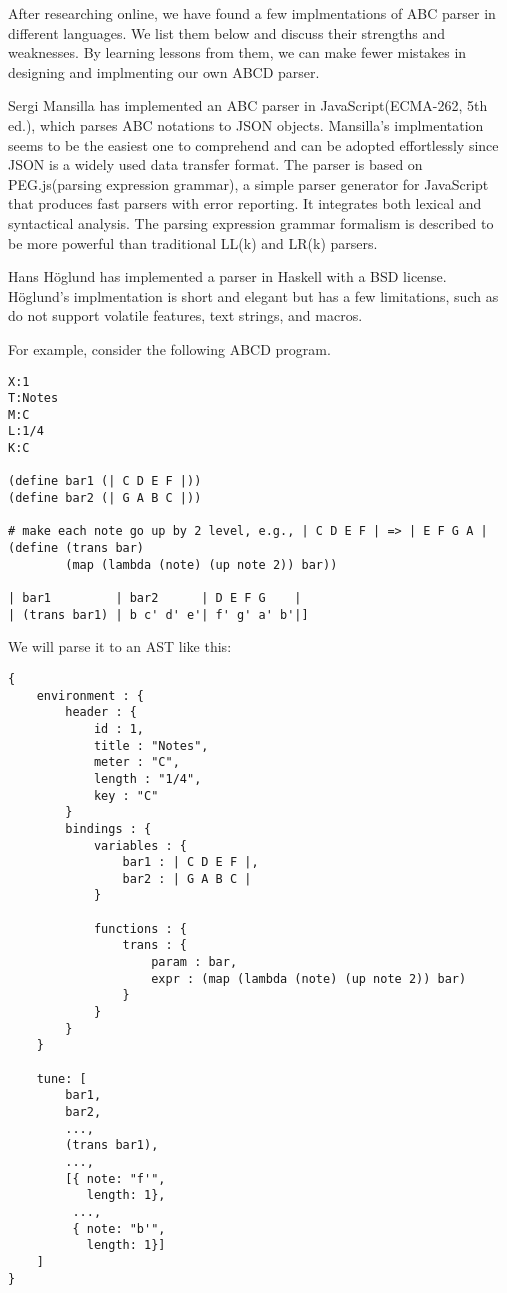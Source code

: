 After researching online, we have found a few implmentations of ABC parser in different languages. We list them below and discuss their strengths and weaknesses. By learning lessons from them, we can make fewer mistakes in designing and implmenting our own ABCD parser.

Sergi Mansilla has implemented an ABC parser in JavaScript(ECMA-262, 5th ed.), which parses ABC notations to JSON objects\cite{Mansilla12}. Mansilla's implmentation seems to be the easiest one to comprehend and can be adopted effortlessly since JSON is a widely used data transfer format. The parser is based on PEG.js(parsing expression grammar), a simple parser generator for JavaScript that produces fast parsers with error reporting\cite{Ryuu17}. It integrates both lexical and syntactical analysis. The parsing expression grammar formalism is described to be more powerful than traditional LL(k) and LR(k) parsers.

Hans H\"{o}glund has implemented a parser in Haskell\cite{Hoglund15} with a BSD license. H\"{o}glund's implmentation is short and elegant but has a few limitations, such as do not support volatile features, text strings, and macros.

For example, consider the following ABCD program.
\begin{verbatim}
X:1
T:Notes
M:C
L:1/4
K:C

(define bar1 (| C D E F |))
(define bar2 (| G A B C |))

# make each note go up by 2 level, e.g., | C D E F | => | E F G A |
(define (trans bar)
        (map (lambda (note) (up note 2)) bar))

| bar1         | bar2      | D E F G    |
| (trans bar1) | b c' d' e'| f' g' a' b'|]
\end{verbatim}

We will parse it to an AST like this:
\begin{verbatim}
{
    environment : {
        header : {
            id : 1,
            title : "Notes",
            meter : "C",
            length : "1/4",
            key : "C"
        }
        bindings : {
            variables : {
                bar1 : | C D E F |,
                bar2 : | G A B C |
            }

            functions : {
                trans : {
                    param : bar,
                    expr : (map (lambda (note) (up note 2)) bar)
                }
            }
        }
    }

    tune: [
        bar1,
        bar2,
        ...,
        (trans bar1),
        ...,
        [{ note: "f'",
           length: 1},
         ...,
         { note: "b'",
           length: 1}]
    ]
}
\end{verbatim}

